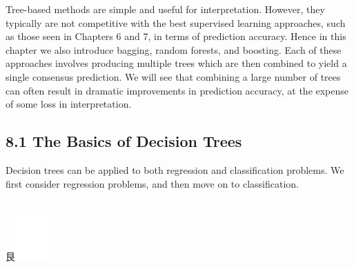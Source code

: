 \documentclass[10pt]{article}
\begin{document}
Tree-based methods are simple and useful for interpretation. However, they typically are not competitive with the best supervised learning approaches, such as those seen in Chapters 6 and 7, in terms of prediction accuracy. Hence in this chapter we also introduce bagging, random forests, and boosting. Each of these approaches involves producing multiple trees which are then combined to yield a single consensus prediction. We will see that combining a large number of trees can often result in dramatic improvements in prediction accuracy, at the expense of some loss in interpretation.

\subsection*{8.1 The Basics of Decision Trees}
Decision trees can be applied to both regression and classification problems. We first consider regression problems, and then move on to classification.\\
$\qquad$

艮\includegraphics[max width=\textwidth]{2025_05_05_efe77898333945044de4g-318}
\end{document}
